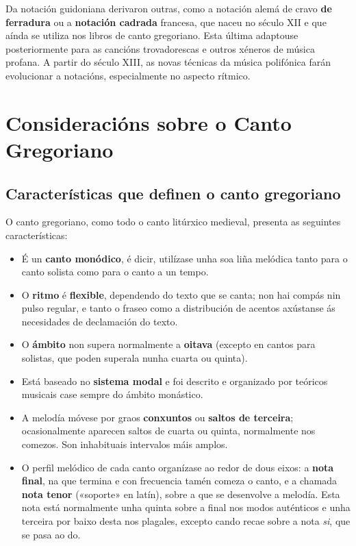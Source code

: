 \documentclass[spanish, a4paper,nobind]{templates/ociamthesis}
\providecommand{\tightlist}{%
  \setlength{\itemsep}{0pt}\setlength{\parskip}{0pt}}
\begin{document}
Da notación guidoniana derivaron outras, como a notación alemá de cravo \textbf{de ferradura} ou a \textbf{notación cadrada} francesa, que naceu no século XII e que aínda se utiliza nos libros de canto gregoriano. Esta última adaptouse posteriormente para as cancións trovadorescas e outros xéneros de música profana. A partir do século XIII, as novas técnicas da música polifónica farán evolucionar a notacións, especialmente no aspecto rítmico.

\newpage

\hypertarget{consideraciuxf3ns-sobre-o-canto-gregoriano}{%
\section*{Consideracións sobre o Canto Gregoriano}\label{consideraciuxf3ns-sobre-o-canto-gregoriano}}

\hypertarget{caracteruxedsticas-que-definen-o-canto-gregoriano}{%
\subsection*{Características que definen o canto gregoriano}\label{caracteruxedsticas-que-definen-o-canto-gregoriano}}

O canto gregoriano, como todo o canto litúrxico medieval, presenta as seguintes características:

\begin{itemize}
\tightlist
\item
  É un \textbf{canto monódico}, é dicir, utilízase unha soa liña melódica tanto para o canto solista como para o canto a un tempo.
\item
  O \textbf{ritmo} é \textbf{flexible}, dependendo do texto que se canta; non hai compás nin pulso regular, e tanto o fraseo como a distribución de acentos axústanse ás necesidades de declamación do texto.
\item
  O \textbf{ámbito} non supera normalmente a \textbf{oitava} (excepto en cantos para solistas, que poden superala nunha cuarta ou quinta).
\item
  Está baseado no \textbf{sistema modal} e foi descrito e organizado por teóricos musicais case sempre do ámbito monástico.
\item
  A melodía móvese por graos \textbf{conxuntos} ou \textbf{saltos de terceira}; ocasionalmente aparecen saltos de cuarta ou quinta, normalmente nos comezos. Son inhabituais intervalos máis amplos.
\item
  O perfil melódico de cada canto organízase ao redor de dous eixos: a \textbf{nota final}, na que termina e con frecuencia tamén comeza o canto, e a chamada \textbf{nota tenor} («soporte» en latín), sobre a que se desenvolve a melodía. Esta nota está normalmente unha quinta sobre a final nos modos auténticos e unha terceira por baixo desta nos plagales, excepto cando recae sobre a nota \emph{si}, que se pasa ao do.
\end{itemize}
\end{document}
